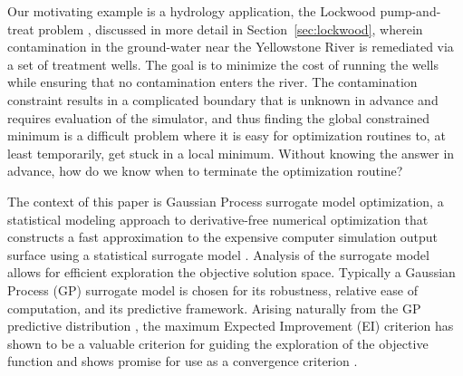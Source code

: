 \documentclass[12pt]{article}
\begin{document}
%
%

%
Our motivating example is a hydrology application, the Lockwood
pump-and-treat problem \citep{lockCite}, discussed in more detail in Section~\ref{sec:lockwood}, wherein contamination in the ground-water near the
Yellowstone River is remediated via a set of treatment wells.  
%
The goal is to minimize the cost of running the wells while ensuring that
no contamination enters the river.  
%
The contamination constraint results in a complicated boundary that is unknown in advance and
requires evaluation of the simulator, and thus finding the global
constrained minimum is a difficult problem where it is easy for
optimization routines to, at least temporarily, get stuck in a local
minimum.  
%
Without knowing the answer in advance, how do we know when
to terminate the optimization routine?


%
%

The context of this paper is Gaussian Process surrogate model
optimization, a statistical modeling approach to derivative-free
numerical optimization that constructs a fast approximation to
the expensive computer simulation output surface using a statistical surrogate model \citep{santnerBook}.
%
Analysis of the surrogate model allows for efficient exploration the objective solution space.  
%
Typically a Gaussian Process (GP) surrogate model is chosen for its
robustness, relative ease of computation, and its predictive framework.
Arising naturally from the GP predictive distribution \citep{gBook}, the maximum Expected Improvement (EI) criterion has shown to be a valuable criterion for guiding the exploration of the objective function and shows promise for use as a convergence criterion \citep{jonesEIOpt, taddyOpt}. %
%
\end{document}
